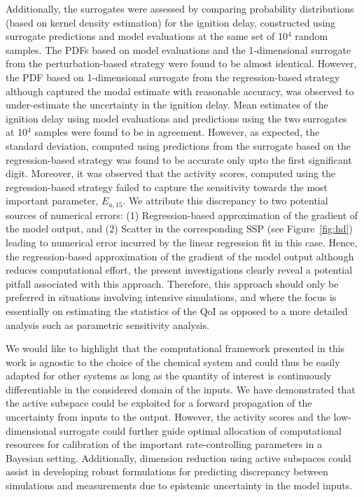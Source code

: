Additionally, the surrogates were assessed by comparing probability distributions (based on kernel density estimation)
for the ignition delay, constructed using surrogate predictions and model evaluations at the same set of 10$^4$
random samples. The PDFs based on model evaluations and the 1-dimensional surrogate from the perturbation-based
strategy were found to be almost identical. However, the PDF based on 1-dimensional surrogate from the
regression-based strategy although captured the modal estimate with reasonable accuracy, was observed to
under-estimate the uncertainty in the ignition delay. Mean estimates of the ignition delay using model evaluations
and predictions using the two surrogates at 10$^4$ samples were found to be in agreement. However, as expected, the
standard deviation, computed using predictions from the surrogate based on the regression-based strategy was
found to be accurate only upto the first significant digit. Moreover, it was observed that the activity scores,
computed using the regression-based strategy failed to capture the sensitivity towards the 
most important parameter, $E_{a,15}$. 
We attribute this discrepancy to two potential sources of numerical errors: (1) Regression-based approximation of the
gradient of the model output, and (2) Scatter in the corresponding SSP (see Figure~\ref{fig:hd}) leading to numerical
error incurred by the linear regression fit in this case. Hence, the regression-based approximation of the gradient 
of the model output although reduces computational effort, the present investigations clearly reveal a potential pitfall associated
with this approach. Therefore, this approach should only be preferred in situations involving intensive simulations, and 
where the focus is essentially on estimating the statistics of the QoI as opposed to a more detailed analysis such as
parametric sensitivity analysis. 
 
 We would like to highlight that the computational framework presented in this work is agnostic to the choice
 of the chemical system and could thus be easily adapted for other systems as long as the quantity of interest
is continuously differentiable in the considered domain of the inputs.
We have demonstrated that the active subspace could be exploited for a forward propagation of
 the uncertainty from inputs to the output. However, the activity scores and the low-dimensional surrogate could further guide optimal allocation of computational resources for  
 calibration of the important rate-controlling parameters in a Bayesian setting. 
Additionally, dimension reduction using active subspaces could assist in developing robust formulations
for predicting discrepancy between simulations and measurements due to epistemic uncertainty in the model inputs.
